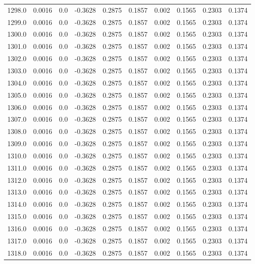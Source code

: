 \begin{longtable}{lrrrrrrrrr}
1298.0 & 0.0016 & 0.0 & -0.3628 & 0.2875 & 0.1857 & 0.002 & 0.1565 & 0.2303 & 0.1374 \\
1299.0 & 0.0016 & 0.0 & -0.3628 & 0.2875 & 0.1857 & 0.002 & 0.1565 & 0.2303 & 0.1374 \\
1300.0 & 0.0016 & 0.0 & -0.3628 & 0.2875 & 0.1857 & 0.002 & 0.1565 & 0.2303 & 0.1374 \\
1301.0 & 0.0016 & 0.0 & -0.3628 & 0.2875 & 0.1857 & 0.002 & 0.1565 & 0.2303 & 0.1374 \\
1302.0 & 0.0016 & 0.0 & -0.3628 & 0.2875 & 0.1857 & 0.002 & 0.1565 & 0.2303 & 0.1374 \\
1303.0 & 0.0016 & 0.0 & -0.3628 & 0.2875 & 0.1857 & 0.002 & 0.1565 & 0.2303 & 0.1374 \\
1304.0 & 0.0016 & 0.0 & -0.3628 & 0.2875 & 0.1857 & 0.002 & 0.1565 & 0.2303 & 0.1374 \\
1305.0 & 0.0016 & 0.0 & -0.3628 & 0.2875 & 0.1857 & 0.002 & 0.1565 & 0.2303 & 0.1374 \\
1306.0 & 0.0016 & 0.0 & -0.3628 & 0.2875 & 0.1857 & 0.002 & 0.1565 & 0.2303 & 0.1374 \\
1307.0 & 0.0016 & 0.0 & -0.3628 & 0.2875 & 0.1857 & 0.002 & 0.1565 & 0.2303 & 0.1374 \\
1308.0 & 0.0016 & 0.0 & -0.3628 & 0.2875 & 0.1857 & 0.002 & 0.1565 & 0.2303 & 0.1374 \\
1309.0 & 0.0016 & 0.0 & -0.3628 & 0.2875 & 0.1857 & 0.002 & 0.1565 & 0.2303 & 0.1374 \\
1310.0 & 0.0016 & 0.0 & -0.3628 & 0.2875 & 0.1857 & 0.002 & 0.1565 & 0.2303 & 0.1374 \\
1311.0 & 0.0016 & 0.0 & -0.3628 & 0.2875 & 0.1857 & 0.002 & 0.1565 & 0.2303 & 0.1374 \\
1312.0 & 0.0016 & 0.0 & -0.3628 & 0.2875 & 0.1857 & 0.002 & 0.1565 & 0.2303 & 0.1374 \\
1313.0 & 0.0016 & 0.0 & -0.3628 & 0.2875 & 0.1857 & 0.002 & 0.1565 & 0.2303 & 0.1374 \\
1314.0 & 0.0016 & 0.0 & -0.3628 & 0.2875 & 0.1857 & 0.002 & 0.1565 & 0.2303 & 0.1374 \\
1315.0 & 0.0016 & 0.0 & -0.3628 & 0.2875 & 0.1857 & 0.002 & 0.1565 & 0.2303 & 0.1374 \\
1316.0 & 0.0016 & 0.0 & -0.3628 & 0.2875 & 0.1857 & 0.002 & 0.1565 & 0.2303 & 0.1374 \\
1317.0 & 0.0016 & 0.0 & -0.3628 & 0.2875 & 0.1857 & 0.002 & 0.1565 & 0.2303 & 0.1374 \\
1318.0 & 0.0016 & 0.0 & -0.3628 & 0.2875 & 0.1857 & 0.002 & 0.1565 & 0.2303 & 0.1374 \\

\end{longtable}
